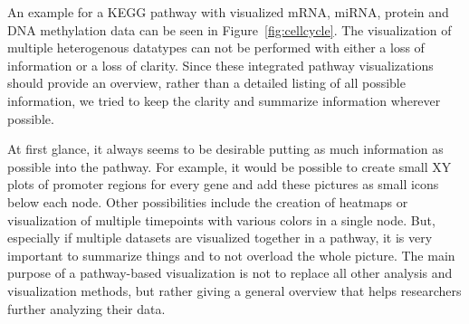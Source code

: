 \documentclass{bioinfo}
\begin{document}


An example for a KEGG pathway with visualized mRNA, miRNA, protein and DNA methylation data can be
seen in Figure~\ref{fig:cellcycle}. The visualization of multiple heterogenous datatypes can not be
performed with either a loss of information or a loss of clarity. Since these integrated pathway
visualizations should provide an overview, rather than a detailed listing of all possible
information, we tried to keep the clarity and summarize information wherever possible.

At first glance, it always seems to be desirable putting as much information as possible into the pathway. For example, it would be possible to create small XY plots of promoter regions for every gene and add these pictures as small icons below each node. Other possibilities include the creation of heatmaps or visualization of multiple timepoints with various colors in a single node.
But, especially if multiple datasets are visualized together in a pathway, it is very important to summarize things and to not overload the whole picture. The main purpose of a pathway-based visualization is not to replace all other analysis and visualization methods, but rather giving a general overview that helps researchers further analyzing their data.
\end{document}
